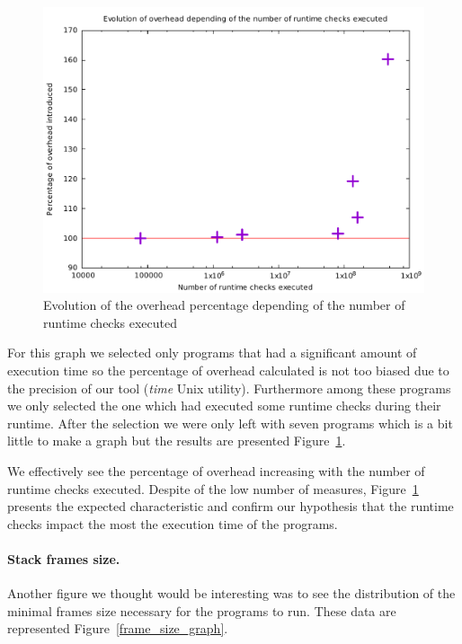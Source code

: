 \documentclass[11pt]{sdm}
\begin{document}
\begin{figure}[!ht]
\centering
\includegraphics[width=1\textwidth]{images/correlation_graph.pdf}
\caption{Evolution of the overhead percentage depending of the number of runtime checks executed}
\label{correlation_graph}
\end{figure}
For this graph we selected only programs that had a significant amount of execution time so the percentage of overhead calculated is not too biased due to the precision of our tool (\textit{time} Unix utility). 
Furthermore among these programs we only selected the one which had executed some runtime checks during their runtime. 
After the selection we were only left with seven programs which is a bit little to make a graph but the results are presented Figure~\ref{correlation_graph}.

We effectively see the percentage of overhead increasing with the number of runtime checks executed.
Despite of the low number of measures, Figure~\ref{correlation_graph} presents the expected characteristic and confirm our hypothesis that the runtime checks impact the most the execution time of the programs.


\paragraph{Stack frames size.}
Another figure we thought would be interesting was to see the distribution of the minimal frames size necessary for the programs to run. These data are represented Figure~\ref{frame_size_graph}.
\end{document}
